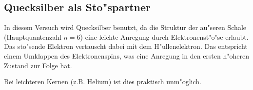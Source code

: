 	\subsection{Quecksilber als Sto"spartner}
	\label{subse:quecksilber}
		In diesem Versuch wird Quecksilber benutzt, da die Struktur der au"seren Schale (Hauptquantenzahl $n = 6$) eine leichte Anregung durch Elektronenst"o"se erlaubt.
		Das sto"sende Elektron vertauscht dabei mit dem H"ullenelektron.
		Das entspricht einem Umklappen des Elektronenspins, was eine Anregung in den ersten h"oheren Zustand zur Folge hat.

		Bei leichteren Kernen (z.B. Helium) ist dies praktisch unm"oglich.
		
	\clearpage
